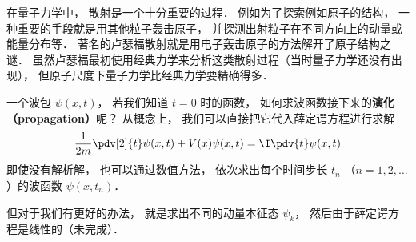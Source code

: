 
\begin{issues}
\issueDraft
\end{issues}


在量子力学中， 散射是一个十分重要的过程． 例如为了探索例如原子的结构， 一种重要的手段就是用其他粒子轰击原子， 并探测出射粒子在不同方向上的动量或能量分布等． 著名的卢瑟福散射就是用电子轰击原子的方法解开了原子结构之谜． 虽然卢瑟福最初使用经典力学来分析这类散射过程（当时量子力学还没有出现）， 但原子尺度下量子力学比经典力学要精确得多．


一个波包 $\psi(x, t)$， 若我们知道 $t = 0$ 时的函数， 如何求波函数接下来的\textbf{演化（propagation）}呢？ 从概念上， 我们可以直接把它代入薛定谔方程进行求解
\begin{equation}
\frac{1}{2m}\pdv[2]{t}\psi(x, t) + V(x) \psi(x, t) = \I \pdv{t} \psi(x, t)
\end{equation}
即使没有解析解， 也可以通过数值方法， 依次求出每个时间步长 $t_n$ （$n = 1, 2, \dots$）的波函数 $\psi(x, t_n)$． %

但对于我们有更好的办法， 就是求出不同的动量本征态 $\psi_k$， 然后由于薛定谔方程是线性的（未完成）．


